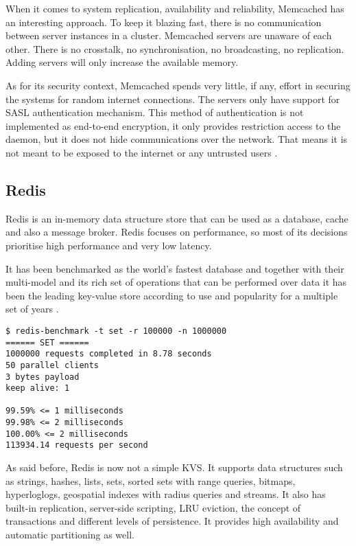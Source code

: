 When it comes to system replication, availability and reliability, Memcached has an interesting approach. To keep it blazing fast, there is no communication between server instances in a cluster. Memcached servers are unaware of each other. There is no crosstalk, no synchronisation, no broadcasting, no replication. Adding servers will only increase the available memory.

As for its security context, Memcached spends very little, if any, effort in securing the systems for random internet connections. The servers only have support for \gls{SASL} \cite{sasl:1} authentication mechanism. This method of authentication is not implemented as end-to-end encryption, it only provides restriction access to the daemon, but it does not hide communications over the network. That means it is not meant to be exposed to the internet or any untrusted users \cite{memcached:2}.

\subsection{Redis} %
\label{ssec:redis}

Redis \cite{redis:1} is an in-memory data structure store that can be used as a database, cache and also a message broker. Redis focuses on performance, so most of its decisions prioritise high performance and very low latency.

It has been benchmarked as the world's fastest database \cite{redis:3} and together with their multi-model and its rich set of operations that can be performed over data it has been the leading key-value store according to use and popularity for a multiple set of years \cite{db-engine:2}.

\lstset{language=Bash, caption=How Fast is Redis, label=lst:redisBenchmark}
\begin{lstlisting}
$ redis-benchmark -t set -r 100000 -n 1000000
====== SET ======
1000000 requests completed in 8.78 seconds
50 parallel clients
3 bytes payload
keep alive: 1

99.59% <= 1 milliseconds
99.98% <= 2 milliseconds
100.00% <= 2 milliseconds
113934.14 requests per second
\end{lstlisting}

As said before, Redis is now not a simple \gls{KVS}. It supports data structures such as strings, hashes, lists, sets, sorted sets with range queries, bitmaps, hyperloglogs, geospatial indexes with radius queries and streams. It also has built-in replication, server-side scripting, \gls{LRU} eviction, the concept of transactions and different levels of persistence. It provides high availability and automatic partitioning as well.


